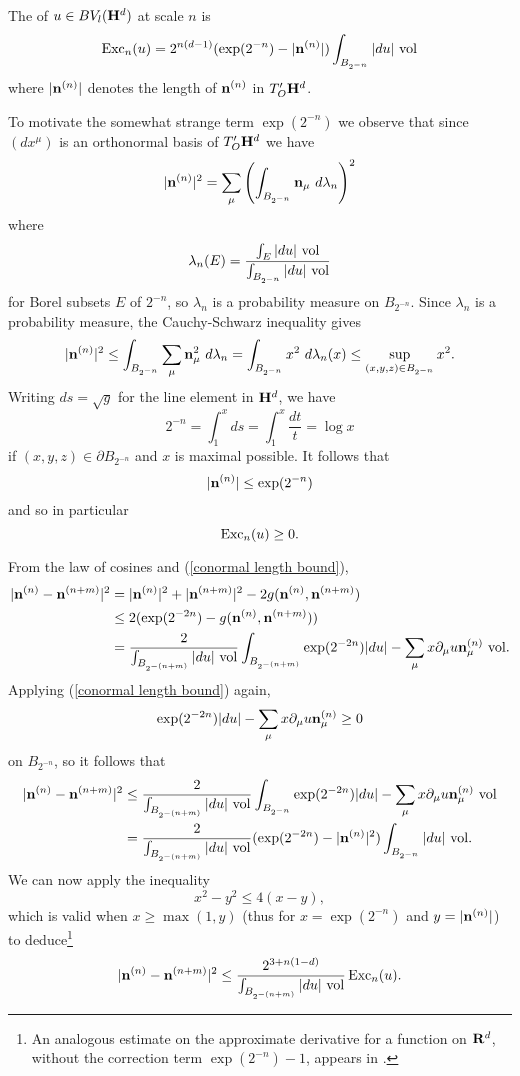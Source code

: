 \begin{definition}
The  of $u \in BV_l(\mathbf H^d)$ at scale $n$ is 
$$\operatorname{Exc}_n(u) = 2^{n(d - 1)} (\exp(2^{-n}) - |\mathbf n^{(n)}|) \int_{B_{2^{-n}}} |du| ~\mathrm{vol}$$
where $|\mathbf n^{(n)}|$ denotes the length of $\mathbf n^{(n)}$ in $T_O' \mathbf H^d$.
\end{definition}

To motivate the somewhat strange term $\exp(2^{-n})$ we observe that since $(dx^\mu)$ is an orthonormal basis of $T_O' \mathbf H^d$ we have 
$$|\mathbf n^{(n)}|^2 = \sum_\mu \left(\int_{B_{2^{-n}}} \mathbf n_\mu ~d\lambda_n\right)^2$$
where
$$\lambda_n(E) = \frac{\int_E |du|~\mathrm{vol}}{\int_{B_{2^{-n}}} |du| ~\mathrm{vol}}$$
for Borel subsets $E$ of $2^{-n}$, so $\lambda_n$ is a probability measure on $B_{2^{-n}}$.
Since $\lambda_n$ is a probability measure, the Cauchy-Schwarz inequality gives 
$$|\mathbf n^{(n)}|^2 \leq \int_{B_{2^{-n}}} \sum_\mu \mathbf n_\mu^2 ~d\lambda_n = \int_{B_{2^{-n}}} x^2 ~d\lambda_n(x) \leq \sup_{(x, y, z) \in B_{2^{-n}}} x^2.$$
Writing $ds = \sqrt g$ for the line element in $\mathbf H^d$, we have
$$2^{-n} = \int_1^x ds = \int_1^x \frac{dt}{t} = \log x$$
if $(x, y, z) \in \partial B_{2^{-n}}$ and $x$ is maximal possible. It follows that
\begin{equation}\label{conormal length bound}
|\mathbf n^{(n)}| \leq \exp(2^{-n})
\end{equation}
and so in particular
$$\operatorname{Exc}_n(u) \geq 0.$$

From the law of cosines and (\ref{conormal length bound}),
\begin{align*}
|\mathbf n^{(n)} - \mathbf n^{(n + m)}|^2 &= |\mathbf n^{(n)}|^2 + |\mathbf n^{(n + m)}|^2 - 2 g(\mathbf n^{(n)}, \mathbf n^{(n + m)})\\
&\leq 2(\exp(2^{-2n}) - g(\mathbf n^{(n)}, \mathbf n^{(n + m)})) \\
&= \frac{2}{\int_{B_{2^{-(n + m)}}} |du| ~\mathrm{vol}} \int_{B_{2^{-(n + m)}}} \exp(2^{-2n}) |du| - \sum_\mu x \partial_\mu u \mathbf n_\mu^{(n)} ~\mathrm{vol}.
\end{align*}
Applying (\ref{conormal length bound}) again,
$$\exp(2^{-2n}) |du| - \sum_\mu x \partial_\mu u \mathbf n_\mu^{(n)} \geq 0$$
on $B_{2^{-n}}$, so it follows that 
\begin{align*}
|\mathbf n^{(n)} - \mathbf n^{(n + m)}|^2 &\leq \frac{2}{\int_{B_{2^{-(n + m)}}} |du| ~\mathrm{vol}} \int_{B_{2^{-n }}} \exp(2^{-2n}) |du| - \sum_\mu x \partial_\mu u \mathbf n_\mu^{(n)} ~\mathrm{vol}\\
&= \frac{2}{\int_{B_{2^{-(n + m)}}} |du| ~\mathrm{vol}} (\exp(2^{-2n}) - |\mathbf n^{(n)}|^2) \int_{B_{2^{-n}}} |du| ~\mathrm{vol}.
\end{align*}
We can now apply the inequality 
$$x^2 - y^2 \leq 4(x - y),$$
which is valid when $x \geq \max(1, y)$ (thus for $x = \exp(2^{-n})$ and $y = |\mathbf n^{(n)}|$)
to deduce\footnote{An analogous estimate on the approximate derivative for a function on $\mathbf{R}^d$, without the correction term $\exp(2^{-n}) - 1$, appears in \cite[pg661]{Miranda66}.}
\begin{equation}\label{excess bounds Cauchy sequence}
|\mathbf n^{(n)} - \mathbf n^{(n + m)}|^2 \leq \frac{2^{3 + n(1 - d)}}{\int_{B_{2^{-(n + m)}}} |du| ~\mathrm{vol}} \operatorname{Exc}_n(u).
\end{equation} 


